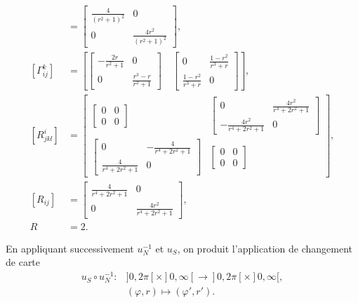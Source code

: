  \begin{align*}
    [g_{ij}] &= \left[\begin{array}{cc}\frac{4}{\left(r^2+1\right)^2} & 0 \\ 0 & \frac{4 r^2}{\left(r^2+1\right)^2}\end{array}\right],\\
    [\Gamma_{ij}^k] &= \left[\left[\begin{array}{cc}-\frac{2 r}{r^2+1} & 0 \\ 0 & \frac{r^3-r}{r^2+1}\end{array}\right] \quad\left[\begin{array}{cc}0 & \frac{1-r^2}{r^3+r} \\ \frac{1-r^2}{r^3+r} & 0\end{array}\right]\right],\\
    [R^i_{jkl}] &= \left[\begin{matrix}\left[\begin{matrix}0 & 0\\0 & 0\end{matrix}\right] & \left[\begin{matrix}0 & \frac{4 r^{2}}{r^{4} + 2 r^{2} + 1}\\- \frac{4 r^{2}}{r^{4} + 2 r^{2} + 1} & 0\end{matrix}\right]\\\left[\begin{matrix}0 & - \frac{4}{r^{4} + 2 r^{2} + 1}\\\frac{4}{r^{4} + 2 r^{2} + 1} & 0\end{matrix}\right] & \left[\begin{matrix}0 & 0\\0 & 0\end{matrix}\right]\end{matrix}\right],\\
    [R_{ij}] &= \left[\begin{array}{cc}\frac{4}{r^4+2 r^2+1} & 0 \\ 0 & \frac{4 r^2}{r^4+2 r^2+1}\end{array}\right],\\
    R &= 2.
 \end{align*}



En appliquant successivement $u_N^{-1}$ et $u_S$, on produit l'application de changement de carte 
\begin{align*}
    u_S \circ u_N^{-1}: &]0, 2\pi[ \times ]0, \infty[ \to ]0, 2\pi[ \times ]0, \infty[,\\
    & (\varphi, r) \mapsto (\varphi', r').
\end{align*}


